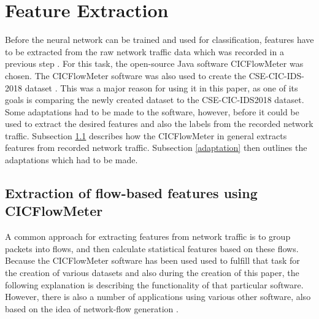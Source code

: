 \documentclass[conference]{IEEEtran}
\begin{document}
\section{Feature Extraction}\label{extraction}
Before the neural network can be trained and used for classification, features have to be extracted from the raw network traffic data which was recorded in a previous step \cite{paper1}. For this task, the open-source Java software CICFlowMeter \cite{cicflowmeter} was chosen. The CICFlowMeter software was also used to create the CSE-CIC-IDS-2018 dataset \cite{max2}. This was a major reason for using it in this paper, as one of its goals is comparing the newly created dataset to the CSE-CIC-IDS2018 dataset. Some adaptations had to be made to the software, however, before it could be used to extract the desired features and also the labels from the recorded network traffic. Subsection \ref{extraction_using_cicflowmeter} describes how the CICFlowMeter in general extracts features from recorded network traffic. Subsection \ref{adaptation} then outlines the adaptations which had to be made.

\subsection{Extraction of flow-based features using CICFlowMeter}\label{extraction_using_cicflowmeter}
A common approach for extracting features from network traffic is to group packets into flows, and then calculate statistical features based on these flows. Because the CICFlowMeter software\cite{cicflowmeter} has been used used to fulfill that task for the creation of various datasets \cite{max2,sopuru,lashkari} and also during the creation of this paper, the following explanation is describing the functionality of that particular software. However, there is also a number of applications using various other software, also based on the idea of network-flow generation \cite{wang,moustafa,celik,waizumi}.
\end{document}
